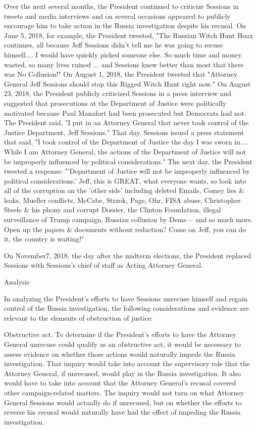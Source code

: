Over the next several months, the President continued to criticize Sessions in tweets and media interviews and on several occasions appeared to publicly encourage him to take action in the Russia investigation despite his recusal.%
On June 5, 2018, for example, the President tweeted, "The Russian Witch Hunt Hoax continues, all because Jeff Sessions didn't tell me he was going to recuse himself.... I would have quickly picked someone else.
So much time and money wasted, so many lives ruined ... and Sessions knew better than most that there was No Collusion!"%
On August 1, 2018, the President tweeted that "Attorney General Jeff Sessions should stop this Rigged Witch Hunt right now."%
On August 23, 2018, the President publicly criticized Sessions in a press interview and suggested that prosecutions at the Department of Justice were politically motivated because Paul Manafort had been prosecuted but Democrats had not.%
The President said, "I put in an Attorney General that never took control of the Justice Department, Jeff Sessions."%
That day, Sessions issued a press statement that said, "I took control of the Department of Justice the day I was sworn in....
While I am Attorney General, the actions of the Department of Justice will not be improperly influenced by political considerations."%
The next day, the President tweeted a response: "'Department of Justice will not be improperly influenced by political considerations.'
Jeff, this is GREAT, what everyone wants, so look into all of the corruption on the 'other side' including deleted Emails, Comey lies \& leaks, Mueller conflicts, McCabe, Strzok, Page, Ohr, FISA abuse, Christopher Steele \& his phony and corrupt Dossier, the Clinton Foundation, illegal surveillance of Trump campaign, Russian collusion by Dems— and so much more.
Open up the papers \& documents without redaction? Come on Jeff, you can do it, the country is waiting!"%

On November7, 2018, the day after the midterm elections, the President replaced Sessions with Sessions's chief of staff as Acting Attorney General.%

Analysis

In analyzing the President's efforts to have Sessions unrecuse himself and regain control of the Russia investigation, the following considerations and evidence are relevant to the elements of obstruction of justice:

Obstructive act.
To determine if the President's efforts to have the Attorney General unrecuse could qualify as an obstructive act, it would be necessary to assess evidence on whether those actions would naturally impede the Russia investigation.
That inquiry would take into account the supervisory role that the Attorney General, if unrecused, would play in the Russia investigation.
It also would have to take into account that the Attorney General's recusal covered other campaign-related matters.
The inquiry would not turn on what Attorney General Sessions would actually do if unrecused, but on whether the efforts to reverse his recusal would naturally have had the effect of impeding the Russia investigation.

